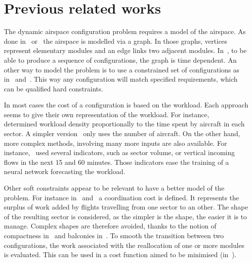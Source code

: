 \documentclass[twoside,twocolumn]{article}
\begin{document}
\section{Previous related works}
\label{sec:previous_related_works}

The dynamic airspace configuration problem requires a model of the airspace. As
done in~\cite{sergeeva2017dynamic} or~\cite{treimuth2016branch} the airspace
is modelled via a graph. In those graphs, vertices represent elementary modules
and an edge links two adjacent modules. In~\cite{treimuth2016branch}, to be
able to produce a sequence of configurations, the graph is time dependent.
An other way to model the problem is to use a constrained set of
configurations as in~\cite{gianazza2010forecasting} and~\cite{bloem2010dynamic}.
This way any configuration will match specified requirements, which can be
qualified hard constraints.

In most cases the cost of a configuration is based on the workload. Each
approach seems to give their own representation of the workload. For instance,
~\cite{bedouet2016} determined workload density proportionally to the time
spent by aircraft in each sector. A simpler version~\cite{sergeeva2017dynamic}
only uses the number of aircraft. On the other hand, more complex methods,
involving many more inputs are also available. For
instance,~\cite{gianazza2010forecasting} used several indicators, such as sector
volume, or vertical incoming flows in the next 15 and 60 minutes. Those
indicators ease the training of a neural network forecasting the workload.

Other soft constraints appear to be relevant to have a better model of
the problem. For instance in~\cite{sergeeva2017dynamic} and~\cite{bedouet2016} a
coordination cost is defined. It represents the surplus of work added by
flights travelling from one sector to an other. The shape of the
resulting sector is considered, as the simpler is
the shape, the easier it is to manage. Complex shapes are therefore avoided,
thanks to the notion of compactness in~\cite{jagare2013constraint} and balconies
in~\cite{sergeeva2017dynamic}. To smooth the transition between two
configurations, the work associated with the reallocation of one or more modules
is evaluated. This can be used in a cost function aimed to be minimised
(in~\cite{bedouet2016}).
\end{document}
